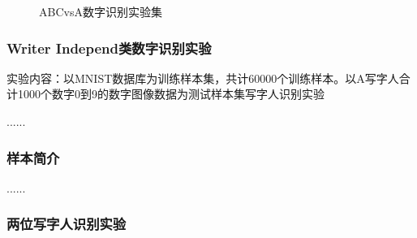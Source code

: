 \begin{figure}[!htbp]
    \centering
    \caption{ABCvsA数字识别实验集}
    \label{fig:both_images}
\end{figure}

\subsubsection{Writer Independ类数字识别实验}
实验内容：以MNIST数据库为训练样本集，共计60000个训练样本。以A写字人合计1000个数字0到9的数字图像数据为测试样本集写字人识别实验

......

\subsubsection{样本简介}
......

\subsubsection{两位写字人识别实验}
